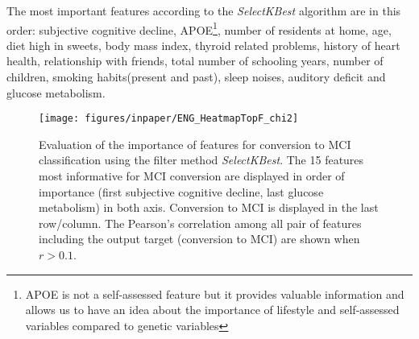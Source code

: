 \documentclass[preprint,12pt]{elsarticle}
\begin{document}
The most important features according to the \emph{SelectKBest} algorithm are in this order: subjective cognitive decline, APOE\footnote{APOE is not a self-assessed feature but it provides valuable information and allows us to have an idea about the importance of lifestyle and self-assessed variables compared to genetic variables}, number of residents at home, age, diet high in sweets, body mass index, thyroid related problems, history of heart health, relationship with friends, total number of schooling years, number of children, smoking habits(present and past), sleep noises, auditory deficit and glucose metabolism. 

\begin{figure}[!htb]
        \centering
        \texttt{[image: figures/inpaper/ENG\_HeatmapTopF\_chi2]}
        \caption{Evaluation of the importance of features for conversion to MCI classification using the filter method \emph{SelectKBest}. The 15 features most informative for MCI conversion are displayed in order of importance (first subjective cognitive decline, last glucose metabolism) in both axis. Conversion to MCI is displayed in the last row/column. The Pearson's correlation among all pair of features including the output target (conversion to MCI) are shown when $r>0.1$. } 
        \label{fig:rf14}
\end{figure}

\end{document}
